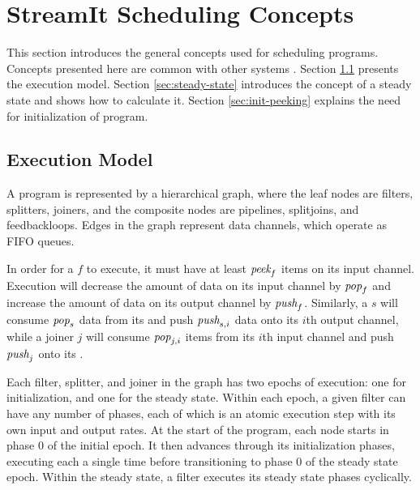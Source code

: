 \section{StreamIt Scheduling Concepts}
\label{chpt:sched-basic}

This section introduces the general concepts used for scheduling
{\StreamIt} programs.  Concepts presented here are common with other
systems \cite{ptolemyoverview}.  Section \ref{sec:exec-model} presents
the {\StreamIt} execution model. Section \ref{sec:steady-state}
introduces the concept of a steady state and shows how to calculate
it. Section \ref{sec:init-peeking} explains the need for
initialization of {\StreamIt} program.

\subsection{{\StreamIt} Execution Model}
\label{sec:exec-model}

A {\StreamIt} program is represented by a hierarchical graph, where
the leaf nodes are filters, splitters, joiners, and the composite
nodes are pipelines, splitjoins, and feedbackloops.  Edges in the
graph represent data channels, which operate as FIFO queues.

In order for a {\filter} $f$ to execute, it must have at least
$\mbox{\it peek}_f$ items on its input channel.  Execution will decrease the
amount of data on its input channel by $\mbox{\it pop}_f$ and increase the
amount of data on its output channel by $\mbox{\it push}_f$. Similarly, a
{\splitter} $s$ will consume $\mbox{\it pop}_s$ data from its {\Input}
{\Channel} and push $\mbox{\it push}_{s,i}$ data onto its $i$th output
channel, while a joiner $j$ will consume $\mbox{\it pop}_{j,i}$ items from
its $i$th input channel and push $\mbox{\it push}_j$ onto its {\Output}
{\Channel}.

Each filter, splitter, and joiner in the graph has two epochs of
execution: one for initialization, and one for the steady state.
Within each epoch, a given filter can have any number of phases, each
of which is an atomic execution step with its own input and output
rates.  At the start of the program, each node starts in phase $0$ of
the initial epoch.  It then advances through its initialization
phases, executing each a single time before transitioning to phase $0$
of the steady state epoch.  Within the steady state, a filter executes
its steady state phases cyclically.

